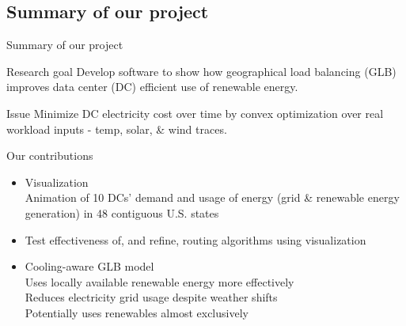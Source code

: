 \documentclass[xcolor=dvipsnames]{beamer}
\begin{document}
\subsection{Summary of our project}
\newcommand{\summaryframe}{
\begin{frame}{Summary of our project}

	\begin{block}{Research goal}  
	Develop software to show how geographical load balancing (GLB) improves data center (DC) efficient use of renewable energy.  
	\end{block}
	
	\begin{block}{Issue} 
	Minimize DC electricity cost over time by convex optimization over real workload inputs - temp, solar, \& wind traces.
	\end{block}

	\begin{block}{Our contributions} 
	\begin{itemize}
		\item{Visualization \\ 
		Animation of 10 DCs' demand and usage of energy (grid \& renewable energy generation) in 48 contiguous U.S. states}
		\item{Test effectiveness of, and refine, routing algorithms using visualization}
		\item{Cooling-aware GLB model \\
			Uses locally available renewable energy more effectively \\
			Reduces electricity grid usage despite weather shifts\\
			Potentially uses renewables almost exclusively}
	\end{itemize} 
	\end{block}

\end{frame}
}\summaryframe
\end{document}
